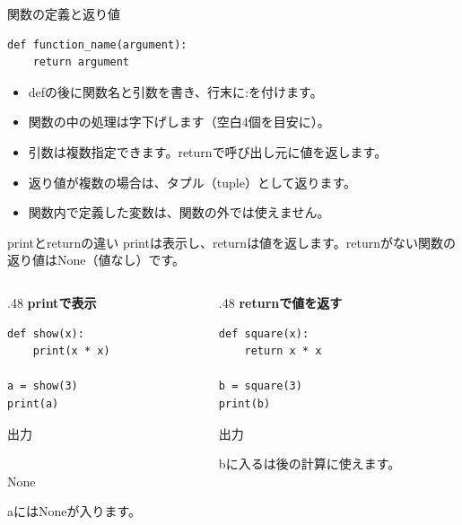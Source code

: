 \documentclass[12pt,aspectratio=43]{beamer}
\newcommand{\code}[1]{{\codefont #1}}
\newcommand{\result}[1]{%
  \par\vspace{1mm}%
  {\small\textcolor{black!60}{出力}}\quad
  {\codefont\fontsize{16}{18}\selectfont #1}\par}
\begin{document}
\begin{frame}[t,fragile]{関数の定義と返り値}
  \setlength{\parskip}{0pt}
\begin{lstlisting}
def function_name(argument):
    return argument
\end{lstlisting}
  \begin{itemize}
    \setlength{\itemsep}{2mm}
    \item \code{def}の後に関数名と引数を書き、行末に\code{:}を付けます。
    \item 関数の中の処理は字下げします（空白4個を目安に）。
    \item 引数は複数指定できます。\code{return}で呼び出し元に値を返します。
    \item 返り値が複数の場合は、タプル（\code{tuple}）として返ります。
    \item 関数内で定義した変数は、関数の外では使えません。
  \end{itemize}
\end{frame}

\begin{frame}[t,fragile]{printとreturnの違い}
  \setlength{\parskip}{0pt}
  \code{print}は表示し、\code{return}は値を返します。\code{return}がない関数の返り値は\code{None}（値なし）です。
  \begin{columns}[T,onlytextwidth]
    \begin{column}{.48\textwidth}
      \textbf{\code{print}で表示}
\begin{lstlisting}[aboveskip=0mm,belowskip=0mm]
def show(x):
    print(x * x)

a = show(3)
print(a)
\end{lstlisting}
      {\small\textcolor{black!60}{出力}}\quad
      {\codefont\fontsize{16}{18}\\
        \hspace*{1cm}None\par}
      {\small \code{a}には\code{None}が入ります。}
    \end{column}
    \begin{column}{.48\textwidth}
      \textbf{\code{return}で値を返す}
\begin{lstlisting}[aboveskip=0mm,belowskip=0mm]
def square(x):
    return x * x

b = square(3)
print(b)
\end{lstlisting}
      \result{9}
      {\small \code{b}に入る\code{9}は後の計算に使えます。}
    \end{column}
  \end{columns}
\end{frame}
\end{document}

